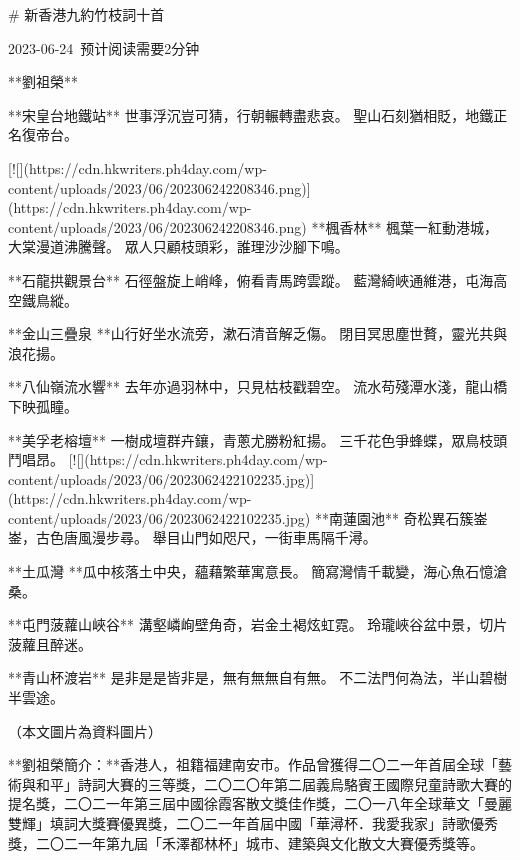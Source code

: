 # 新香港九約竹枝詞十首

2023-06-24 预计阅读需要2分钟

**劉祖榮**

**宋皇台地鐵站**  
世事浮沉豈可猜，行朝輾轉盡悲哀。  
聖山石刻猶相貶，地鐵正名復帝台。

[![](https://cdn.hkwriters.ph4day.com/wp-content/uploads/2023/06/202306242208346.png)](https://cdn.hkwriters.ph4day.com/wp-content/uploads/2023/06/202306242208346.png)  
**楓香林**  
楓葉一紅動港城，大棠漫道沸騰聲。  
眾人只顧枝頭彩，誰理沙沙腳下鳴。

**石龍拱觀景台**  
石徑盤旋上峭峰，俯看青馬跨雲蹤。  
藍灣綺峽通維港，屯海高空鐵鳥縱。

**金山三疊泉  
**山行好坐水流旁，漱石清音解乏傷。  
閉目冥思塵世贅，靈光共與浪花揚。

**八仙嶺流水響**  
去年亦過羽林中，只見枯枝戳碧空。  
流水苟殘潭水淺，龍山橋下映孤瞳。

**美孚老榕壇**  
一樹成壇群卉鑲，青蔥尤勝粉紅揚。  
三千花色爭蜂蝶，眾鳥枝頭鬥唱昂。  
[![](https://cdn.hkwriters.ph4day.com/wp-content/uploads/2023/06/2023062422102235.jpg)](https://cdn.hkwriters.ph4day.com/wp-content/uploads/2023/06/2023062422102235.jpg)  
**南蓮園池**  
奇松異石簇崟崟，古色唐風漫步尋。  
舉目山門如咫尺，一街車馬隔千潯。

**土瓜灣  
**瓜中核落土中央，蘊藉繁華寓意長。  
簡寫灣情千載變，海心魚石憶滄桑。

**屯門菠蘿山峽谷**  
溝壑嶙峋壁角奇，岩金土褐炫虹霓。  
玲瓏峽谷盆中景，切片菠蘿且醉迷。

**青山杯渡岩**  
是非是是皆非是，無有無無自有無。  
不二法門何為法，半山碧樹半雲途。

（本文圖片為資料圖片）

**劉祖榮簡介：**香港人，祖籍福建南安市。作品曾獲得二〇二一年首屆全球「藝術與和平」詩詞大賽的三等獎，二〇二〇年第二屆義烏駱賓王國際兒童詩歌大賽的提名獎，二〇二一年第三屆中國徐霞客散文獎佳作獎，二〇一八年全球華文「曼麗雙輝」填詞大獎賽優異獎，二〇二一年首屆中國「華潯杯．我愛我家」詩歌優秀獎，二〇二一年第九屆「禾澤都林杯」城市、建築與文化散文大賽優秀獎等。